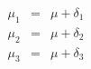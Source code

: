 \begin{eqnarray}
	\mu_1 &=& \mu + \delta_1 \\
	\mu_2 &=& \mu + \delta_2 \\
	\mu_3 &=& \mu + \delta_3
\end{eqnarray}
